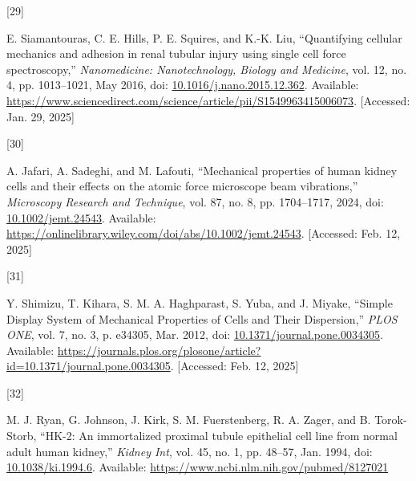 \documentclass[
  paper=a4,
  ,captions=tableheading
]{scrartcl}
\newlength{\cslhangindent}
\newlength{\csllabelwidth}
\newenvironment{CSLReferences}[2] %
  {\begin{list}{}{%
   \setlength{\itemindent}{0pt}
   \setlength{\leftmargin}{0pt}
   \setlength{\parsep}{0pt}
   \ifodd #1
    \setlength{\leftmargin}{\cslhangindent}
    \setlength{\itemindent}{-1\cslhangindent}
   \fi
   \setlength{\itemsep}{#2\baselineskip}}}
  {\end{list}}
\newcommand{\CSLLeftMargin}[1]{\parbox[t]{\csllabelwidth}{\strut#1\strut}}
\newcommand{\CSLRightInline}[1]{\parbox[t]{\linewidth - \csllabelwidth}{\strut#1\strut}}
\begin{document}
\begin{CSLReferences}{0}{0}
\CSLLeftMargin{{[}29{]} }%
\CSLRightInline{E. Siamantouras, C. E. Hills, P. E. Squires, and K.-K.
Liu, {``Quantifying cellular mechanics and adhesion in renal tubular
injury using single cell force spectroscopy,''} \emph{Nanomedicine:
Nanotechnology, Biology and Medicine}, vol. 12, no. 4, pp. 1013--1021,
May 2016, doi:
\href{https://doi.org/10.1016/j.nano.2015.12.362}{10.1016/j.nano.2015.12.362}.
Available:
\url{https://www.sciencedirect.com/science/article/pii/S1549963415006073}.
{[}Accessed: Jan. 29, 2025{]}}

\CSLLeftMargin{{[}30{]} }%
\CSLRightInline{A. Jafari, A. Sadeghi, and M. Lafouti, {``Mechanical
properties of human kidney cells and their effects on the atomic force
microscope beam vibrations,''} \emph{Microscopy Research and Technique},
vol. 87, no. 8, pp. 1704--1717, 2024, doi:
\href{https://doi.org/10.1002/jemt.24543}{10.1002/jemt.24543}.
Available:
\url{https://onlinelibrary.wiley.com/doi/abs/10.1002/jemt.24543}.
{[}Accessed: Feb. 12, 2025{]}}

\CSLLeftMargin{{[}31{]} }%
\CSLRightInline{Y. Shimizu, T. Kihara, S. M. A. Haghparast, S. Yuba, and
J. Miyake, {``Simple {Display System} of {Mechanical Properties} of
{Cells} and {Their Dispersion},''} \emph{PLOS ONE}, vol. 7, no. 3, p.
e34305, Mar. 2012, doi:
\href{https://doi.org/10.1371/journal.pone.0034305}{10.1371/journal.pone.0034305}.
Available:
\url{https://journals.plos.org/plosone/article?id=10.1371/journal.pone.0034305}.
{[}Accessed: Feb. 12, 2025{]}}

\CSLLeftMargin{{[}32{]} }%
\CSLRightInline{M. J. Ryan, G. Johnson, J. Kirk, S. M. Fuerstenberg, R.
A. Zager, and B. Torok-Storb, {``{HK-2}: An immortalized proximal tubule
epithelial cell line from normal adult human kidney,''} \emph{Kidney
Int}, vol. 45, no. 1, pp. 48--57, Jan. 1994, doi:
\href{https://doi.org/10.1038/ki.1994.6}{10.1038/ki.1994.6}. Available:
\url{https://www.ncbi.nlm.nih.gov/pubmed/8127021}}

\end{CSLReferences}
\end{document}
